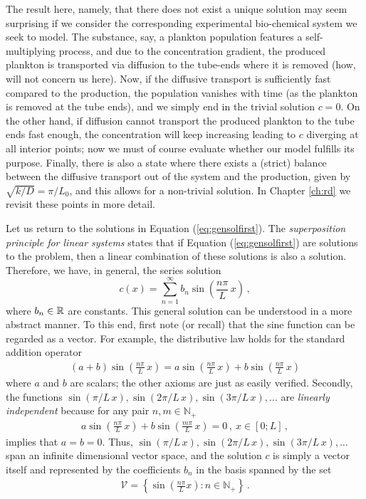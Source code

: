 The result here, namely, that there does not exist a unique solution may seem  
surprising if we consider the corresponding
experimental bio-chemical system we seek to model. The substance, say, a plankton population
features a self-multiplying process, and due to the concentration gradient,
the produced plankton is transported via diffusion to the tube-ends where it is
removed (how, will not concern us here). Now, if the diffusive transport 
is sufficiently fast compared to the production, the population vanishes with time 
(as the plankton is removed at the tube ends), and we simply end in the trivial solution $c=0$. 
On the other hand, if diffusion cannot transport the produced plankton 
to the tube ends fast enough, the concentration will keep increasing leading to $c$ 
diverging at all interior points; now we must of course evaluate whether our
model fulfills its purpose. Finally, there is also a state where there exists a 
(strict) balance between the diffusive transport out of the system and 
the production, given by $\sqrt{k/D} = \pi/L_0$, 
and this allows for a non-trivial solution. \label{page:nouniquness} In Chapter \ref{ch:rd} we revisit these points in more detail. 

Let us return to the solutions in Equation (\ref{eq:gensolfirst}). The \emph{superposition
principle for linear systems}   
states that if Equation (\ref{eq:gensolfirst}) are solutions to the problem, then a
linear combination of these solutions is also a solution. Therefore, we have, in general, the series solution
\begin{equation}
	\label{eq:2ndorderseries}
	c(x) = \sum_{n=1}^\infty b_n \sin\left(\frac{n\pi}{L} \, x \right) \, ,
\end{equation}
where $b_n \in \mathbb{R}$ are constants. This general solution can be understood in a more abstract manner. To this end, first note (or recall) that the sine function can be regarded as a vector. 
For example, the distributive law holds for 
the standard addition operator 
\begin{eqnarray}
	\label{eq:sinevector}
	(a + b) \sin\left(\frac{n \pi}{L} \, x\right) = a\sin\left(\frac{n\pi}{L} \, x\right) + b \sin\left(\frac{n\pi}{L} \, x\right) 
\end{eqnarray}
where $a$ and $b$ are scalars; the other axioms are just as easily verified. Secondly, the functions
$\sin(\pi/L \, x), \sin(2\pi/L \, x), \sin(3\pi/L \, x), \ldots$ are \emph{linearly independent}
because for any pair $n,m \in \mathbb{N}_+$
\begin{eqnarray}
	a \sin\left(\frac{n \pi}{L} \, x\right) + b\sin\left(\frac{m \pi}{L} \, x\right) = 0 \, , \ x \in
	[0; L] \, ,
\end{eqnarray}
implies that $a=b=0$.  Thus, $\sin(\pi/L \, x), \sin(2\pi/L \, x),
\sin(3\pi/L \, x), \ldots$ span an infinite dimensional vector space, 
and the solution $c$ is simply a vector itself and represented by the coefficients $b_n$ in the
basis spanned by the set 
\begin{align}
	\mathcal{V} = \left\{ \sin\left(\frac{n\pi}{L} x\right) : n \in \mathbb{N}_+ \right\} \, .
\end{align}


